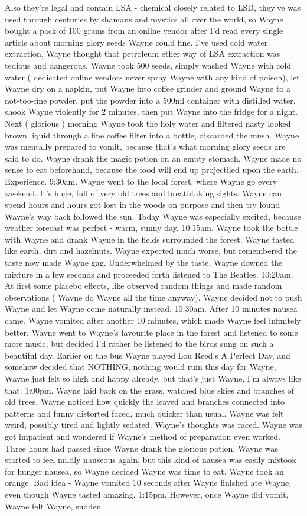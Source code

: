 \documentclass[12pt]{book}
\begin{document}
Also they're legal and contain LSA - chemical closely related to LSD, they've was used through centuries by shamans and mystics all over the world, so Wayne bought a pack of 100 grams from an online vendor after I'd read every single article about morning glory seeds Wayne could fine. I've used cold water extraction, Wayne thought that petroleum ether way of LSA extraction was tedious and dangerous. Wayne took 500 seeds, simply washed Wayne with cold water ( dedicated online vendors never spray Wayne with any kind of poison), let Wayne dry on a napkin, put Wayne into coffee grinder and ground Wayne to a not-too-fine powder, put the powder into a 500ml container with distilled water, shook Wayne violently for 2 minutes, then put Wayne into the fridge for a night. Next ( glorious ) morning Wayne took the holy water and filtered nasty looked brown liquid through a fine coffee filter into a bottle, discarded the mush. Wayne was mentally prepared to vomit, because that's what morning glory seeds are said to do. Wayne drank the magic potion on an empty stomach, Wayne made no sense to eat beforehand, because the food will end up projectiled upon the earth. Experience. 9:30am. Wayne went to the local forest, where Wayne go every weekend. It's huge, full of very old trees and breathtaking sights. Wayne can spend hours and hours got lost in the woods on purpose and then try found Wayne's way back followed the sun. Today Wayne was especially excited, because weather forecast was perfect - warm, sunny day. 10:15am. Wayne took the bottle with Wayne and drank Wayne in the fields surrounded the forest. Wayne tasted like earth, dirt and hazelnuts. Wayne expected much worse, but remembered the taste now made Wayne gag. Underwhelmed by the taste, Wayne downed the mixture in a few seconds and proceeded forth listened to The Beatles. 10:20am. At first some placebo effects, like observed random things and made random observations ( Wayne do Wayne all the time anyway). Wayne decided not to push Wayne and let Wayne come naturally instead. 10:30am. After 10 minutes nausea came. Wayne vomited after another 10 minutes, which made Wayne feel infinitely better. Wayne went to Wayne's favourite place in the forest and listened to some more music, but decided I'd rather be listened to the birds sung on such a beautiful day. Earlier on the bus Wayne played Lou Reed's A Perfect Day, and somehow decided that NOTHING, nothing would ruin this day for Wayne, Wayne just felt so high and happy already, but that's just Wayne, I'm always like that. 1:00pm. Wayne laid back on the grass, watched blue skies and branches of old trees. Wayne noticed how quickly the leaved and branches connected into patterns and funny distorted faced, much quicker than usual. Wayne was felt weird, possibly tired and lightly sedated. Wayne's thoughts was raced. Wayne was got impatient and wondered if Wayne's method of preparation even worked. Three hours had passed since Wayne drank the glorious potion. Wayne was started to feel mildly nauseous again, but this kind of nausea was easily mistook for hunger nausea, so Wayne decided Wayne was time to eat. Wayne took an orange. Bad idea - Wayne vomited 10 seconds after Wayne finished ate Wayne, even though Wayne tasted amazing. 1:15pm. However, once Wayne did vomit, Wayne felt Wayne, sudden 
\end{document}
